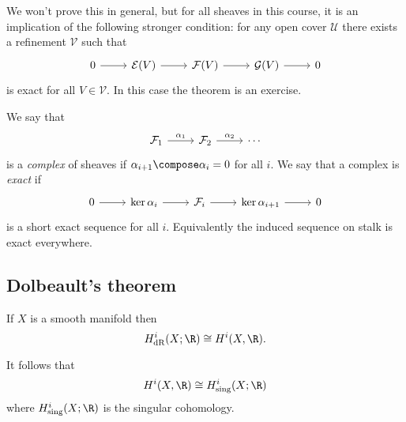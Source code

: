 \documentclass[a4paper]{article}
\begin{document}
We won't prove this in general, but for all sheaves in this course, it is an implication of the following stronger condition: for any open cover \(\mathcal U\) there exists a refinement \(\mathcal V\) such that
\[
  \begin{tikzcd}
    0 \ar[r] & \mathcal E(V) \ar[r] & \mathcal F(V) \ar[r] & \mathcal G(V) \ar[r] & 0
  \end{tikzcd}
\]
is exact for all \(V \in \mathcal V\). In this case the theorem is an exercise.

We say that
\[
  \begin{tikzcd}
    \mathcal F_1 \ar[r, "\alpha_1"] & \mathcal F_2 \ar[r, "\alpha_2"] & \cdots
  \end{tikzcd}
\]
is a \emph{complex} of sheaves if \(\alpha_{i + 1} \compose \alpha_i = 0\) for all \(i\). We say that a complex is \emph{exact} if
\[
  \begin{tikzcd}
    0 \ar[r] & \ker \alpha_i \ar[r] & \mathcal F_i \ar[r] & \ker \alpha_{i + 1} \ar[r] & 0 
  \end{tikzcd}
\]
is a short exact sequence for all \(i\). Equivalently the induced sequence on stalk is exact everywhere.

\subsection{Dolbeault's theorem}

\begin{theorem}[de Rham]
  If \(X\) is a smooth manifold then
  \[
    H^i_{\mathrm{dR}}(X; \R) \cong H^i(X, \R).
  \]
\end{theorem}

\begin{remark}
  It follows that
  \[
    H^i(X, \R) \cong H^i_{\text{sing}}(X; \R)
  \]
  where \(H^i_{\text{sing}}(X; \R)\) is the singular cohomology.
\end{remark}
\end{document}
